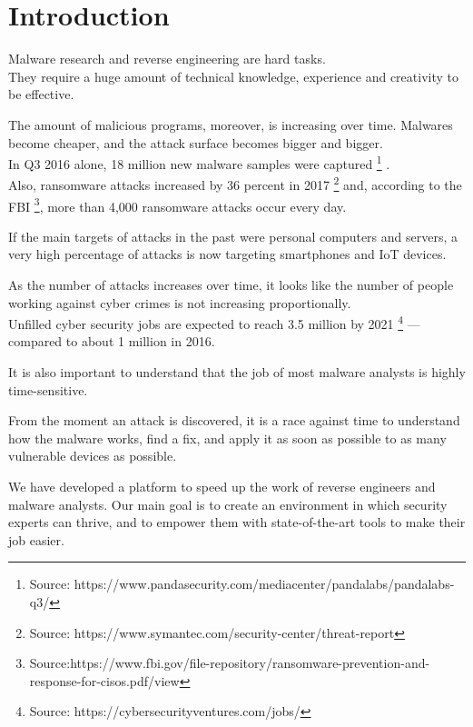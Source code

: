 \documentclass{article}
\date{\vspace{-5ex}}
\begin{document}
\maketitle

\section{Introduction}

Malware research and reverse engineering are hard tasks.\\
They require a huge amount of technical knowledge, experience and creativity to be effective.\par
The amount of malicious programs, moreover, is increasing over time. Malwares become cheaper, and the attack surface becomes bigger and bigger.\\
In Q3 2016 alone, 18 million new malware samples were captured \footnote{Source: https://www.pandasecurity.com/mediacenter/pandalabs/pandalabs-q3/} .\\
Also, ransomware attacks increased by 36 percent in 2017 \footnote{Source: https://www.symantec.com/security-center/threat-report} and, according to the FBI  \footnote{Source:https://www.fbi.gov/file-repository/ransomware-prevention-and-response-for-cisos.pdf/view}, more than 4,000 ransomware attacks occur every day.\par
If the main targets of attacks in the past were personal computers and servers, a very high percentage of attacks is now targeting smartphones and IoT devices.\par
As the number of attacks increases over time, it looks like the number of people working against cyber crimes is not increasing proportionally.\\
Unfilled cyber security jobs are expected to reach 3.5 million by 2021 \footnote{Source: https://cybersecurityventures.com/jobs/} — compared to about 1 million in 2016.\par
It is also important to understand that the job of most malware analysts is highly time-sensitive. \par
From the moment an attack is discovered, it is a race against time to understand how the malware works, find a fix, and apply it as soon as possible to as many vulnerable devices as possible.\par

We have developed a platform to speed up the work of reverse engineers and malware analysts.
Our main goal is to create an environment in which security experts can thrive, and to empower them with state-of-the-art tools to make their job easier.
\end{document}
